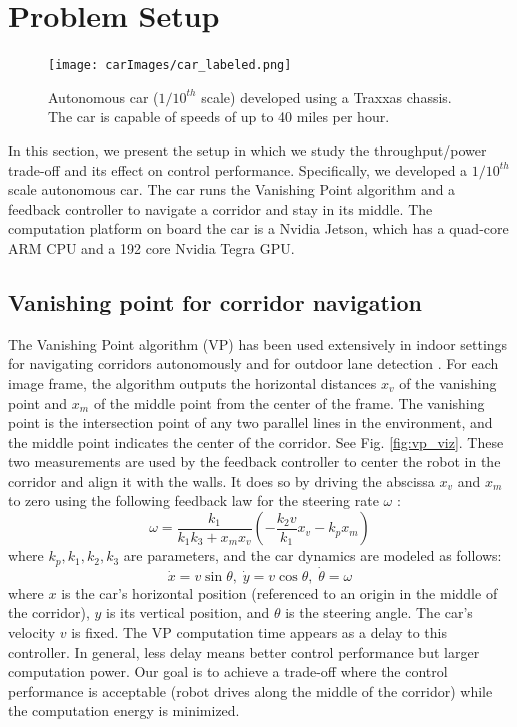 \section{Problem Setup}
\label{sec:problemSetup}
\begin{figure}[t]
	\centering
	\texttt{[image: carImages/car\_labeled.png]}
	\caption{Autonomous car ($1/10^{th}$ scale) developed using a Traxxas chassis. The car is capable of speeds of up to 40 miles per hour.}
	\label{fig:traxxas}
\end{figure} 
In this section, we present the setup in which we study the throughput/power trade-off and its effect on control performance. 
Specifically, we developed a $1/10^{th}$ scale autonomous car.
The car runs the Vanishing Point algorithm \cite{VP1,VP2} and a feedback controller to navigate a corridor and stay in its middle.
The computation platform on board the car is a Nvidia Jetson, which has a quad-core ARM CPU and a 192 core Nvidia Tegra GPU.


\subsection{Vanishing point for corridor navigation}
\label{sec:vp}
The Vanishing Point algorithm (VP) \cite{VP1} has been used extensively in indoor settings for navigating corridors autonomously \cite{VP2, VP3} and for outdoor lane detection \cite{gallagher2002ground}.
For each image frame, the algorithm outputs the horizontal distances $x_v$ of the vanishing point and $x_m$ of the middle point from the center of the frame. 
The vanishing point is the intersection point of any two parallel lines in the environment, and the middle point indicates the center of the corridor. 
See Fig. \ref{fig:vp_viz}.
These two measurements are used by the feedback controller to center the robot in the corridor and align it with the walls. 
It does so by driving the abscissa $x_v$ and $x_m$ to zero using the following feedback law for the steering rate $\omega$ \cite{VP2}:
\begin{equation}
\omega = \frac{k_1}{k_1k_3+x_mx_v}(-\frac{k_2v}{k_1}x_v -k_px_m)
\label{eq:controller}
\end{equation}
where $k_p,k_1,k_2,k_3$ are parameters, and the car dynamics are modeled as follows:
\begin{equation}
\label{eq:cardynamics}
\dot{x} = v\sin\theta,\; \dot{y} = v\cos\theta, \;\dot{\theta} = \omega 
\end{equation}
where $x$ is the car's horizontal position (referenced to an origin in the middle of the corridor), $y$ is its vertical position, and $\theta$ is the steering angle.
The car's velocity $v$ is fixed.
The VP computation time appears as a delay to this controller. 
In general, less delay means better control performance but larger computation power. 
Our goal is to achieve a trade-off where the control performance is acceptable (robot drives along the middle of the corridor) while the computation energy is minimized. 

